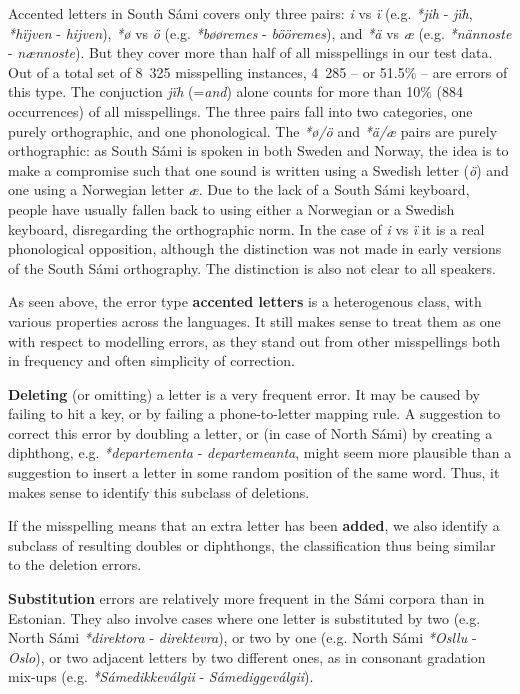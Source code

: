 \documentclass{flammie}
\begin{document}
Accented letters in South Sámi covers only three pairs: \textit{i} vs \textit{ï}
(e.g. \textit{*jih} - \textit{jïh}, \textit{*hïjven} - \textit{hijven}),
\textit{*ø} vs \textit{ö} (e.g. \textit{*bøøremes} - \textit{bööremes}), and
\textit{*ä} vs \textit{æ} (e.g. \textit{*nännoste} - \textit{nænnoste}). But
they cover more than half of all misspellings in our test data. Out of a total
set of 8~325 misspelling instances, 4~285 -- or 51.5\% -- are errors of this
type. The conjuction \textit{jïh} (=\textit{and}) alone counts for more than
10\% (884 occurrences) of all misspellings. The three pairs fall into two
categories, one purely orthographic, and one phonological. The \textit{*ø/ö} and
\textit{*ä/æ} pairs are purely orthographic: as South Sámi is spoken in both
Sweden and Norway, the idea is to make a compromise such that one sound is
written using a Swedish letter (\textit{ö}) and one using a Norwegian letter
\textit{æ}. Due to the lack of a South Sámi keyboard, people have usually fallen
back to using either a Norwegian or a Swedish keyboard, disregarding the
orthographic norm. In the case of \textit{i} vs \textit{ï} it is a real
phonological opposition, although the distinction was not made in early versions
of the South Sámi orthography. The distinction is also not clear to all
speakers.

As seen above, the error type \textbf{accented letters} is a heterogenous class,
with various properties across the languages. It still makes sense to treat them
as one with respect to modelling errors, as they stand out from other
misspellings both in frequency and often simplicity of correction.

\textbf{Deleting} (or omitting) a letter is a very frequent error. It may be
caused by failing to hit a key, or by failing a phone-to-letter mapping rule. A
suggestion to correct this error by doubling a letter, or (in case of North
Sámi) by creating a diphthong, e.g. \textit{*departementa} -
\textit{departemeanta}, might seem more plausible than a suggestion to insert a
letter in some random position of the same word. Thus, it makes sense to
identify this subclass of deletions.

If the misspelling means that an extra letter has been \textbf{added}, we also
identify a subclass of resulting doubles or diphthongs, the classification thus
being similar to the deletion errors.

\textbf{Substitution} errors are relatively more frequent in the Sámi corpora
than in Estonian. They also involve cases where one letter is substituted by two
(e.g. North Sámi \textit{*direktora} - \textit{direktevra}), or two by one (e.g.
North Sámi \textit{*Osllu} - \textit{Oslo}), or two adjacent letters by two
different ones, as in consonant gradation mix-ups (e.g.
\textit{*Sámedikkeválgii} - \textit{Sámediggeválgii}).
\end{document}
